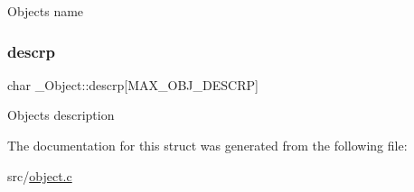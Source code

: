 Object\textquotesingle{}s name \mbox{\label{struct__Object_affa493ad8fdeafe924950f7388356a55}} 
\subsubsection{\texorpdfstring{descrp}{descrp}}
{\footnotesize\ttfamily char \+\_\+\+Object\+::descrp\mbox{[}M\+A\+X\+\_\+\+O\+B\+J\+\_\+\+D\+E\+S\+C\+RP\mbox{]}}

Object\textquotesingle{}s description 

The documentation for this struct was generated from the following file\+:\begin{DoxyCompactItemize}
\item 
src/\hyperlink{object_8c}{object.\+c}\end{DoxyCompactItemize}
